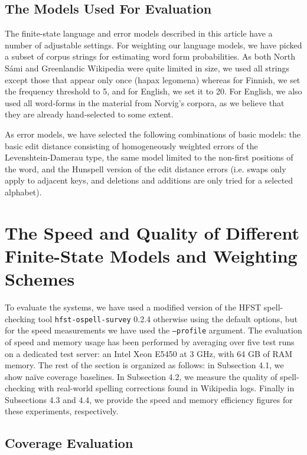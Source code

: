 \documentclass[postprint]{flammie}
\begin{document}
\subsection{The Models Used For Evaluation}

The finite-state language and error models described in this article have a
number of adjustable settings. For weighting our language models, we have
picked a subset of corpus strings for estimating word form probabilities. As
both North Sámi and Greenlandic Wikipedia were quite limited in size, we used
all strings except those that appear only once (hapax legomena) whereas for
Finnish, we set the frequency threshold to 5, and for English, we set it to 20.
For English, we also used all word-forms in the material from Norvig’s corpora,
as we believe that they are already hand-selected to some extent.

As error models, we have selected the following combinations of basic models:
the basic edit distance consisting of homogeneously weighted errors of the
Levenshtein-Damerau type, the same model limited to the non-first positions of
the word, and the Hunspell version of the edit distance errors (i.e. swaps only
apply to adjacent keys, and deletions and additions are only tried for a
selected alphabet).

\section{The Speed and Quality of Different Finite-State Models and
Weighting Schemes}

To evaluate the systems, we have used a modified version of the HFST
spell-checking tool \texttt{hfst-ospell-survey} 0.2.4 otherwise using the
default options, but for the speed measurements we have used the
\texttt{--profile} argument.  The evaluation of speed and memory usage has been
performed by averaging over five test runs on a dedicated test server: an Intel
Xeon E5450 at 3 GHz, with 64 GB of RAM memory. The rest of the section is
organized as follows: in Subsection 4.1, we show naïve coverage baselines.  In
Subsection 4.2, we measure the quality of spell-checking with real-world
spelling corrections found in Wikipedia logs. Finally in Subsections 4.3 and
4.4, we provide the speed and memory efficiency figures for these experiments,
respectively.

\subsection{Coverage Evaluation}
\end{document}
